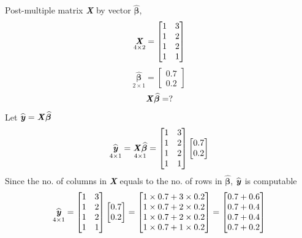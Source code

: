 \documentclass[12pt]{report}
\begin{document}
\justify
Post-multiple matrix \textbf{\textit{X}} by vector $\widehat{\boldsymbol{\beta}}$,
{$$\underset{4\times2}{\textbf{\textit{X}}}
	=
	\begin{bmatrix}
	1 & 3 \\
	1 & 2 \\
	1 & 2 \\
	1 & 1 
	\end{bmatrix}
$$}
{$$\underset{2\times1}{\widehat{\boldsymbol{\beta}}}
	=
	\begin{bmatrix}
	0.7 \\
	0.2 
	\end{bmatrix}
$$}
{$${\textbf{\textit{X}}\widehat{\boldsymbol{\beta}}}
	=
	?
$$}
\justify 
Let $\widehat{\textbf{\textit{y}}}=\textbf{\textit{X}}\widehat{\boldsymbol{\beta}}$
{$$\underset{4\times1}{\widehat{\textbf{\textit{y}}}}
	=
	\underset{4\times1}{\textbf{\textit{X}}\widehat{\boldsymbol{\beta}}}
	=
	\begin{bmatrix}
	1 & 3 \\
	1 & 2 \\
	1 & 2 \\
	1 & 1 
	\end{bmatrix}
	\begin{bmatrix}
	0.7 \\
	0.2 
	\end{bmatrix}
$$}
\justify 
Since the no. of columns in \textbf{\textit{X}} equals to the no. of rows in $\widehat{\boldsymbol{\beta}}$, $\widehat{\textbf{\textit{y}}}$ is computable
{$$\underset{4\times1}{\widehat{\textbf{\textit{y}}}}
	=
	\begin{bmatrix}
	1 & 3 \\
	1 & 2 \\
	1 & 2 \\
	1 & 1 
	\end{bmatrix}
	\begin{bmatrix}
	0.7 \\
	0.2 
	\end{bmatrix}
	=
	\begin{bmatrix}
	1\times0.7+3\times0.2 \\
	1\times0.7+2\times0.2 \\
	1\times0.7+2\times0.2 \\
	1\times0.7+1\times0.2 
	\end{bmatrix}
	=
	\begin{bmatrix}
	0.7+0.6 \\
	0.7+0.4 \\
	0.7+0.4 \\
	0.7+0.2 
	\end{bmatrix}
$$}
\end{document}
